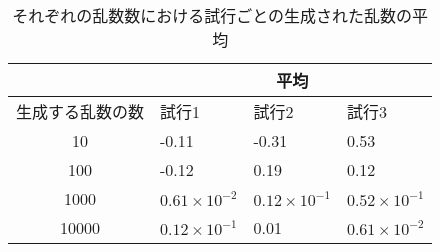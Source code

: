\begin{table}[t]
  \begin{center}
      \caption{それぞれの乱数数における試行ごとの生成された乱数の平均}
    \label{table1}
\begin{tabular}{c|lll}
\hline
\multicolumn{1}{l|}{}         & \multicolumn{3}{c}{平均}                                           \\ \hline
\multicolumn{1}{l|}{生成する乱数の数} & \multicolumn{1}{l|}{試行1}    & \multicolumn{1}{l|}{試行2}   & 試行3   \\ \hline
10                            & \multicolumn{1}{l|}{-0.11}  & \multicolumn{1}{l|}{-0.31} & 0.53  \\
100                           & \multicolumn{1}{l|}{-0.12}  & \multicolumn{1}{l|}{0.19}  & 0.12  \\
1000                          & \multicolumn{1}{l|}{$0.61\times 10^{-2}$} & \multicolumn{1}{l|}{$0.12 \times 10^{-1}$} & $0.52 \times 10^{-1}$  \\
10000                         & \multicolumn{1}{l|}{$0.12\times 10^{-1}$}  & \multicolumn{1}{l|}{0.01} & $0.61\times 10^{-2}$ \\ \hline
\end{tabular}
\end{center}
\end{table}